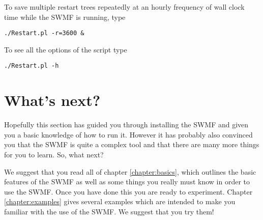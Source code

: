 To save multiple restart trees repeatedly at an hourly frequency of 
wall clock time while the SWMF is running, type
\begin{verbatim}
./Restart.pl -r=3600 &
\end{verbatim}
To see all the options of the script type
\begin{verbatim}
./Restart.pl -h
\end{verbatim}

\section{What's next?}

Hopefully this section has guided you through installing the SWMF and
given you a basic knowledge of how to run it.  However it has probably
also convinced you that the SWMF is quite a complex tool and that there
are many more things for you to learn.  So, what next?

We suggest that you read all of chapter \ref{chapter:basics}, which
outlines the basic features of the SWMF as well as some things you
really must know in order to use the SWMF.  Once you have done this you
are ready to experiment.  Chapter \ref{chapter:examples} gives several 
examples which are intended to make you familiar with the use of the
SWMF.  We suggest that you try them!

%
